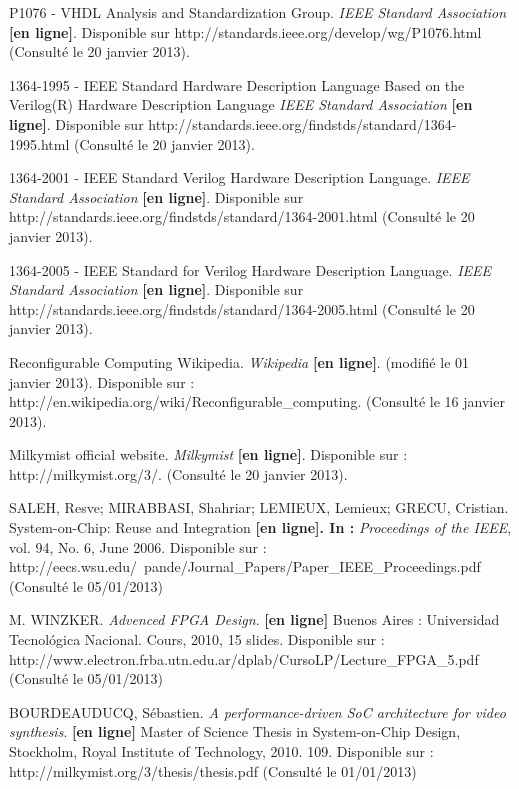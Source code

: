 P1076 - VHDL Analysis and Standardization Group. \textit{IEEE Standard Association} \textbf{[en ligne]}. Disponible sur http://standards.ieee.org/develop/wg/P1076.html (Consulté le 20 janvier 2013).

1364-1995 - IEEE Standard Hardware Description Language Based on the Verilog(R) Hardware Description Language \textit{IEEE Standard Association} \textbf{[en ligne]}. Disponible sur http://standards.ieee.org/findstds/standard/1364-1995.html (Consulté le 20 janvier 2013).

1364-2001 - IEEE Standard Verilog Hardware Description Language. \textit{IEEE Standard Association} \textbf{[en ligne]}. Disponible sur http://standards.ieee.org/findstds/standard/1364-2001.html (Consulté le 20 janvier 2013).

1364-2005 - IEEE Standard for Verilog Hardware Description Language. \textit{IEEE Standard Association} \textbf{[en ligne]}. Disponible sur http://standards.ieee.org/findstds/standard/1364-2005.html (Consulté le 20 janvier 2013).

Reconfigurable Computing Wikipedia. \textit{Wikipedia} \textbf{[en ligne]}. (modifié le 01 janvier 2013). Disponible sur : http://en.wikipedia.org/wiki/Reconfigurable\_computing. (Consulté le 16 janvier 2013).

Milkymist official website. \textit{Milkymist} \textbf{[en ligne]}. Disponible sur : http://milkymist.org/3/. (Consulté le 20 janvier 2013).


SALEH, Resve; MIRABBASI, Shahriar; LEMIEUX, Lemieux; GRECU, Cristian. System-on-Chip: Reuse and Integration \textbf{[en ligne]. In :} \textit{Proceedings of the IEEE}, vol. 94, No. 6, June 2006. Disponible sur : http://eecs.wsu.edu/~pande/Journal\_Papers/Paper\_IEEE\_Proceedings.pdf (Consulté le 05/01/2013)

M. WINZKER. \textit{Advenced FPGA Design}. \textbf{[en ligne]} Buenos Aires : Universidad Tecnológica Nacional. Cours, 2010, 15 slides. Disponible sur : http://www.electron.frba.utn.edu.ar/dplab/CursoLP/Lecture\_FPGA\_5.pdf (Consulté le 05/01/2013)

BOURDEAUDUCQ, Sébastien. \textit{A performance-driven SoC architecture for video synthesis}. \textbf{[en ligne]} Master of Science Thesis in System-on-Chip Design, Stockholm, Royal Institute of Technology, 2010. 109. Disponible sur : http://milkymist.org/3/thesis/thesis.pdf (Consulté le 01/01/2013)